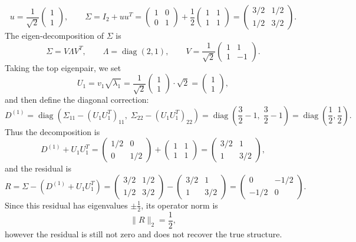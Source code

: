 \documentclass[final,hidelinks,onefignum,onetabnum]{siamart250211}
\providecommand{\1}{\mathbf{1}}
\theoremstyle{plain}
\begin{document}
\[
u = \frac{1}{\sqrt{2}}\begin{pmatrix}1\\1\end{pmatrix},
\qquad
\Sigma = I_2 + uu^{T} = \begin{pmatrix}1 & 0\\ 0 & 1\end{pmatrix} + \frac{1}{2} \begin{pmatrix}1 & 1\\ 1 & 1\end{pmatrix} = \begin{pmatrix}3/2 & 1/2\\ 1/2 & 3/2\end{pmatrix}.
\]
The eigen-decomposition of \(\Sigma\) is
\[
\Sigma = V\Lambda V^T, \qquad \Lambda = \operatorname{diag}(2, 1), \qquad V = \frac{1}{\sqrt{2}}\begin{pmatrix}1 & 1\\ 1 & -1\end{pmatrix}.
\]
Taking the top eigenpair, we set
\[
U_1 = v_1 \sqrt{\lambda_1} = \frac{1}{\sqrt{2}}\begin{pmatrix}1\\1\end{pmatrix} \cdot \sqrt{2} = \begin{pmatrix}1\\1\end{pmatrix},
\]
and then define the diagonal correction:
\[
D^{(1)} = \operatorname{diag}\left(\Sigma_{11} - (U_1 U_1^T)_{11},\; \Sigma_{22} - (U_1 U_1^T)_{22} \right) = \operatorname{diag}\left( \frac{3}{2} - 1,\; \frac{3}{2} - 1 \right) = \operatorname{diag}\left( \frac{1}{2}, \frac{1}{2} \right).
\]
Thus the decomposition is
\[
D^{(1)} + U_1 U_1^T = \begin{pmatrix}1/2 & 0\\ 0 & 1/2\end{pmatrix} + \begin{pmatrix}1 & 1\\ 1 & 1\end{pmatrix} = \begin{pmatrix}3/2 & 1\\ 1 & 3/2\end{pmatrix},
\]
and the residual is
\[
R = \Sigma - (D^{(1)} + U_1 U_1^T) = \begin{pmatrix}3/2 & 1/2\\ 1/2 & 3/2\end{pmatrix} - \begin{pmatrix}3/2 & 1\\ 1 & 3/2\end{pmatrix} = \begin{pmatrix}0 & -1/2\\ -1/2 & 0\end{pmatrix}.
\]
Since this residual has eigenvalues \(\pm \tfrac{1}{2}\), its operator norm is
\[
\|R\|_2 = \frac{1}{2},
\]
 however the residual is still not zero and does not recover the true structure.
\end{document}
